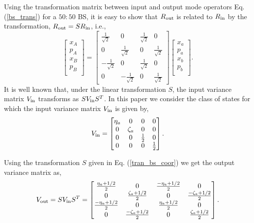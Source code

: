 \documentclass[letter,scriptaddress,twocolumn, prl,showkeys]{revtex4}
\begin{document}
Using the transformation matrix between input and output mode operators Eq.
(\ref{bs_trans}) for a $50:50$ BS, it is easy to show that $R_{\rm{out}}$
is related to $R_{\rm{in}}$ by the transformation, $R_{\rm{out}}=S R_{\rm{in}}$,
i.e.,
\begin{equation}
\begin{bmatrix}
x_{A} \\
p_{A} \\
x_{B} \\
p_{B} \\
\end{bmatrix}=\begin{bmatrix}
\frac{1}{\sqrt{2}}& 0& \frac{1}{\sqrt{2}}& 0\\
0& \frac{1}{\sqrt{2}}& 0& \frac{1}{\sqrt{2}}\\
-\frac{1}{\sqrt{2}}& 0& \frac{1}{\sqrt{2}}& 0\\
0& -\frac{1}{\sqrt{2}}& 0& \frac{1}{\sqrt{2}}
\end{bmatrix}
\begin{bmatrix}
x_{a} \\
p_{a} \\
x_{b} \\
p_{b} \\
\end{bmatrix} .
\label{tran_bs_coor}
\end{equation}
It is well known that, under the linear transformation $S$, the input variance matrix $V_{\rm{in}}$ transforms as $SV_{\rm{in}}S^{T}$. In this paper we consider the class of states for which the input variance matrix $V_{\rm{in}}$ is given by,
\begin{equation}
V_{\rm{in}}=\begin{bmatrix}
\eta_{a}& 0& 0& 0\\
0& \zeta_{a}& 0& 0\\
0& 0& \frac{1}{2}& 0\\
0& 0& 0& \frac{1}{2}
\end{bmatrix} .
\end{equation}

Using the transformation $S$ given in Eq. (\ref{tran_bs_coor}) we get the output variance matrix as,
\begin{equation}
V_{\rm{out}}=SV_{\rm{in}}S^{T}=\begin{bmatrix}
\frac{\eta_{a}+1/2}{2}& 0& \frac{-\eta_{a}+1/2}{2}& 0\\
0& \frac{\zeta_{a}+1/2}{2}& 0& \frac{-\zeta_{a}+1/2}{2}\\
\frac{-\eta_{a}+1/2}{2}& 0& \frac{\eta_{a}+1/2}{2}& 0\\
0& \frac{-\zeta_{a}+1/2}{2}& 0& \frac{\zeta_{a}+1/2}{2}
\end{bmatrix} .
\end{equation}
\end{document}
